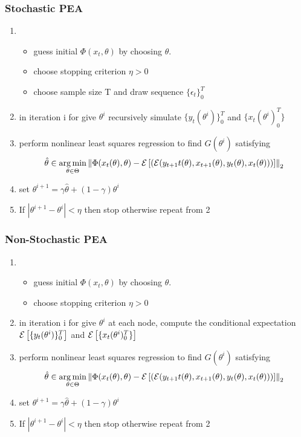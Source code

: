 \documentclass[tikz]{beamer}
\begin{document}
 \begin{frame}
  \frametitle{Stochastic PEA}


    \begin{enumerate}
    \item \ 
      \begin{itemize}
      \item guess initial $\Phi(x_t,\theta)$ by choosing $\theta$. 
      \item choose stopping criterion $\eta>0$
      \item choose sample size T and draw sequence $\{\epsilon_t\}^T_0$
      \end{itemize}
    \item in iteration i for give $\theta^i$ recursively simulate 
$\{y_t(\theta^i)\}^T_0$ and $\{x_t(\theta^i)^T_0\}$
\item perform nonlinear least squares regression to find $G(\theta^i)$ satisfying 
  \begin{gather}
    \hat{\theta} \in \operatorname*{arg\,min}_{\theta \in \Theta} \left\lVert\Phi(x_t(\theta),\theta)- {\mathcal{E}\left [ (\mathcal{E}(y_{t+1}t(\theta),x_{t+1}(\theta),y_t(\theta),x_t(\theta))) \right ]} \right\rVert_2
  \end{gather}
\item set $\theta^{i+1} = \gamma \hat{\theta} + (1-\gamma)\theta^i$
\item If $|\theta^{i+1} - \theta^i| < \eta$ then stop otherwise repeat from 2
    \end{enumerate}


 \end{frame}

 \begin{frame}
  \frametitle{Non-Stochastic PEA}


    \begin{enumerate}
    \item \ 
      \begin{itemize}
      \item guess initial $\Phi(x_t,\theta)$ by choosing $\theta$. 
      \item choose stopping criterion $\eta>0$
      \end{itemize}
    \item in iteration i for give $\theta^i$ at each node, compute the conditional expectation
${\mathcal{E}\left [ \{y_t(\theta^i)\}^T_0 \right ]}$ and ${\mathcal{E}\left [ \{x_t(\theta^i)^T_0\} \right ]}$
\item perform nonlinear least squares regression to find $G(\theta^i)$ satisfying 
  \begin{gather}
    \hat{\theta} \in \operatorname*{arg\,min}_{\theta \in \Theta} \left\lVert\Phi(x_t(\theta),\theta)- {\mathcal{E}\left [ (\mathcal{E}(y_{t+1}t(\theta),x_{t+1}(\theta),y_t(\theta),x_t(\theta))) \right ]} \right\rVert_2
  \end{gather}
\item set $\theta^{i+1} = \gamma \hat{\theta} + (1-\gamma)\theta^i$
\item If $|\theta^{i+1} - \theta^i| < \eta$ then stop otherwise repeat from 2
    \end{enumerate}


 \end{frame}
\end{document}
